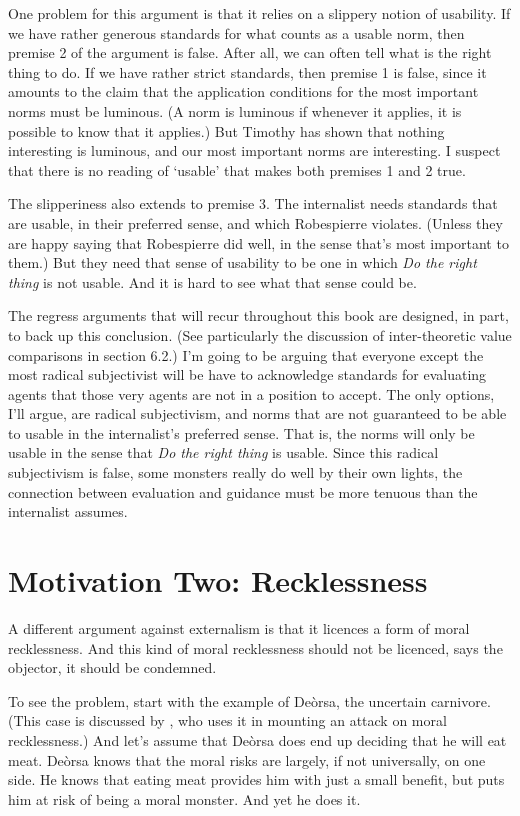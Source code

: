 One problem for this argument is that it relies on a slippery notion of usability. If we have rather generous standards for what counts as a usable norm, then premise 2 of the argument is false. After all, we can often tell what is the right thing to do. If we have rather strict standards, then premise 1 is false, since it amounts to the claim that the application conditions for the most important norms must be luminous. (A norm is luminous if whenever it applies, it is possible to know that it applies.) But Timothy \citet{Williamson2000} has shown that nothing interesting is luminous, and our most important norms are interesting. I suspect that there is no reading of `usable' that makes both premises 1 and 2 true.

The slipperiness also extends to premise 3. The internalist needs standards that are usable, in their preferred sense, and which \gls{Robespierre} violates. (Unless they are happy saying that Robespierre did well, in the sense that's most important to them.) But they need that sense of usability to be one in which \emph{Do the right thing} is not usable. And it is hard to see what that sense could be.

The regress arguments that will recur throughout this book are designed, in part, to back up this conclusion. (See particularly the discussion of inter-theoretic value comparisons in section 6.2.) I'm going to be arguing that everyone except the most radical subjectivist will be have to acknowledge standards for evaluating agents that those very agents are not in a position to accept. The only options, I'll argue, are radical subjectivism, and norms that are not guaranteed to be able to usable in the internalist's preferred sense. That is, the norms will only be usable in the sense that \emph{Do the right thing} is usable. Since this radical subjectivism is false, some monsters really do well by their own lights, the connection between evaluation and guidance must be more tenuous than the internalist assumes.

\section{Motivation Two: Recklessness}
\label{motivationtwo:recklessness}

A different argument against externalism is that it licences a form of moral recklessness. And this kind of moral recklessness should not be licenced, says the objector, it should be condemned.

To see the problem, start with the example of Deòrsa, the uncertain carnivore. (This case is discussed by \citet{Guerrero2007}, who uses it in mounting an attack on moral recklessness.) And let's assume that Deòrsa does end up deciding that he will eat meat. Deòrsa knows that the moral risks are largely, if not universally, on one side. He knows that eating meat provides him with just a small benefit, but puts him at risk of being a moral monster. And yet he does it.

